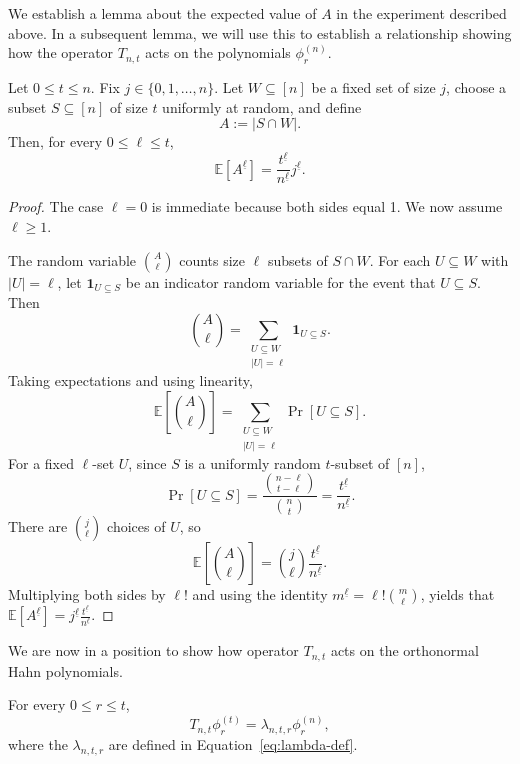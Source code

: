 \documentclass[manuscript,nonacm]{acmart}
\begin{document}
We establish a lemma about the expected value of $A$ in the experiment described above. In a subsequent lemma, we will use this to establish a relationship showing how the operator $T_{n,t}$ acts on the polynomials $\phi_r^{(n)}$. 
\begin{lemma}
\label{lem:hypergeometric-factorial-moments}
Let \(0\le t\le n\).  Fix \(j\in\{0,1,\dots,n\}\). Let \(W\subseteq[n]\) be a fixed set of size \(j\), choose
a subset \(S\subseteq[n]\) of size \(t\) uniformly at random, and define
\[
    A:=|S\cap W|.
\]
Then, for every \(0\le \ell\le t\),
\[
    \mathbb E\left[A^{\underline{\ell}}\right]
    =
    \frac{t^{\underline{\ell}}}{n^{\underline{\ell}}}
    j^{\underline{\ell}}.
\]
\end{lemma}

\begin{proof}
The case \(\ell=0\) is immediate because both sides equal 1. We now assume \(\ell\ge 1\).

The random variable \(\binom A\ell\) counts size \(\ell\) subsets of
\(S\cap W\).  For each \(U\subseteq W\) with \(|U|=\ell\), let $\mathbf 1_{U\subseteq S}$ be an indicator random variable for the event that $U\subseteq S$.
Then
\[
    \binom A\ell
    =
    \sum_{\substack{U\subseteq W\\ |U|=\ell}} \mathbf 1_{U\subseteq S}.
\]
Taking expectations and using linearity,
\[
    \mathbb E\left[\binom A\ell\right]
    =
    \sum_{\substack{U\subseteq W\\ |U|=\ell}}
    \Pr[U\subseteq S].
\]
For a fixed \(\ell\)-set \(U\), since \(S\) is a uniformly random
\(t\)-subset of \([n]\),
\[
    \Pr[U\subseteq S]
    =
    \frac{\binom{n-\ell}{t-\ell}}{\binom nt}
    =
    \frac{t^{\underline \ell}}{n^{\underline \ell}}.
\]
There are \(\binom j\ell\) choices of \(U\), so
\[
    \mathbb E\left[\binom A\ell\right]
    =
    \binom j\ell
    \frac{t^{\underline \ell}}{n^{\underline \ell}}.
\]
Multiplying both sides by \(\ell!\) and using the identity $m^{\underline \ell}=\ell!\binom m\ell$, yields that $\mathbb{E}\left[A^{\underline{\ell}}\right]=j^{\underline \ell}\frac{t^{\underline \ell}}{n^{\underline \ell}}$.
\end{proof}
We are now in a position to show how operator $T_{n,t}$ acts on the orthonormal Hahn polynomials.
\begin{lemma}
\label{lem:hahn-intertwining}
For every $0\le r\le t$, 
\[
T_{n,t}\phi_r^{(t)}=\lambda_{n,t,r}\phi_r^{(n)},
\]
where the $\lambda_{n,t,r}$ are defined in Equation~\ref{eq:lambda-def}.
\end{lemma}
\end{document}
